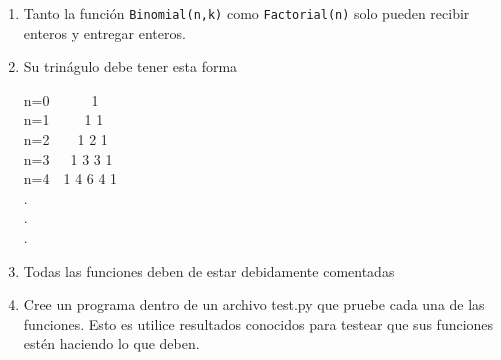 \documentclass[12pt]{article}
\begin{document}
\begin{enumerate}
	\item Tanto la función \texttt{Binomial(n,k)} como \texttt{Factorial(n)} solo pueden recibir enteros y entregar enteros.
	
	
\item Su trinágulo debe tener esta forma
\begin{flushleft}
n=0~~~~~~1\\
n=1~~~~~1 1 \\
n=2~~~~1 2 1 \\
n=3~~~1 3 3 1 \\
n=4~~1 4 6 4 1\\
.\\.\\.
\end{flushleft}
\item Todas las funciones deben de estar debidamente comentadas

\item Cree un programa dentro de un archivo test.py que pruebe cada una de las funciones. Esto es utilice resultados conocidos para testear que sus funciones estén haciendo lo que deben.
	
\end{enumerate}
\end{document}
